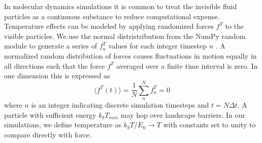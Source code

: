 \documentclass[twocolumn,preprintnumbers,amsmath,amssymb,aps,prx]{revtex4}
\begin{document}
  In molecular dynamics simulations
  it is common to treat the 
  invisible fluid particles as a continuous substance
  to reduce computational expense.
  Temperature effects
  can be modeled by applying randomized forces $f^T$
  to the visible particles.
  We use the normal distristribution from the NumPy random module
  to generate a series of $f^T_n$ values for
  each integer timestep $n$ \cite{numpy}.
  A normalized random distribution of forces
  causes fluctuations in %
  motion 
  equally in all
  directions such that the force $f^T$
  averaged over a finite time interval
  is zero.  In one dimension this is expressed as 
  \begin{equation}
    \langle f^T(t) \rangle = \frac{1}{N} \sum_n^N f^T_n = 0
  \end{equation}
  where $n$ is an integer indicating
  discrete simulation timesteps and 
  $t = N \Delta t$.
  A particle
  with sufficient energy $k_b T_{min}$ may 
  hop over landscape
  barriers.
  In our simulations,
  we define temperature as 
  $k_b T/E_0 \rightarrow T$
  with constants set to unity
  to
  compare directly with force. 
\end{document}
